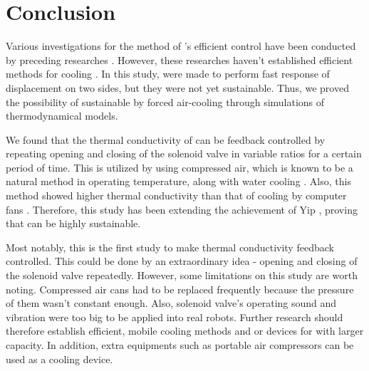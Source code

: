 \section{Conclusion}
Various investigations for the method of \scpnospace's efficient control have been conducted by preceding researches \cite{haines,mirvakili,yip}. %
However, these researches haven't established efficient methods for cooling \scpnospace. %
In this study, \antas were made to perform fast response of displacement on two sides, but they were not yet sustainable. Thus, we proved the possibility of sustainable \apc by forced air-cooling through simulations of thermodynamical models. %

We found that the thermal conductivity of \scp can be feedback controlled by repeating opening and closing of the solenoid valve in variable ratios for a certain period of time. %
This is utilized by using compressed air, which is known to be a natural method in operating temperature, along with water cooling \cite{madden}.
Also, this method showed higher thermal conductivity than that of cooling by computer fans \cite{yip}.
Therefore, this study has been extending the achievement of Yip \etal, proving that \apc can be highly sustainable.

Most notably, this is the first study to make thermal conductivity feedback controlled. 
This could be done by an extraordinary idea - opening and closing of the  solenoid valve repeatedly.
However, some limitations on this study are worth noting. 
Compressed air cans had to be replaced frequently because the pressure of them wasn't constant enough. 
Also, solenoid valve's operating sound and vibration were too big to be applied into real robots.
Further research should therefore establish efficient, mobile cooling methods and or devices for \scps with larger capacity. 
In addition, extra equipments such as portable air compressors can be used as a cooling device.



